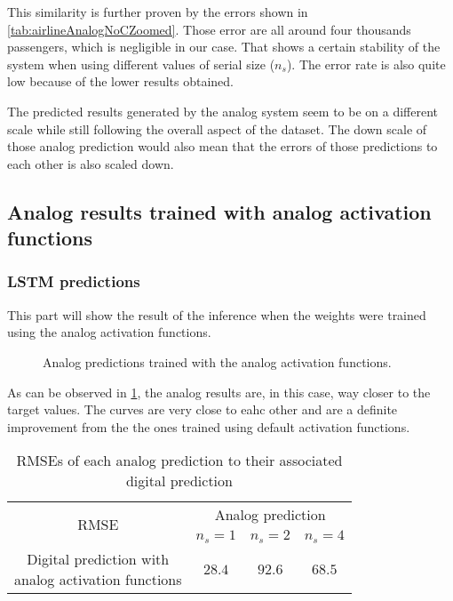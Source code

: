 This similarity is further proven by the errors shown in \cref{tab:airlineAnalogNoCZoomed}. Those error are all around four thousands passengers, which is negligible in our case. That shows a certain stability of the system when using different values of serial size ($n_s$). The error rate is also quite low because of the lower results obtained.

The predicted results generated by the analog system seem to be on a different scale while still following the overall aspect of the dataset. The down scale of those analog prediction would also mean that the errors of those predictions to each other is also scaled down.

\subsection{Analog results trained with analog activation functions}

\subsubsection{\ac{LSTM} predictions}

This part will show the result of the inference when the weights were trained using the analog activation functions.

\begin{figure}[H]
  \centering
  
  \caption{Analog predictions trained with the analog activation functions.}
  \label{graph:airlineAnalog}
\end{figure}

As can be observed in \cref{graph:airlineAnalog}, the analog results are, in this case, way closer to the target values. The curves are very close to eahc other and are a definite improvement from the the ones trained using default activation functions.

\begin{table}[H]
  \centering
  \begin{tabular}{|c|c|c|c|}
    \hline
    \multirow{2}{*}{\acs{RMSE}} & \multicolumn{3}{|c|}{Analog prediction}\\
    \cline{2-4}
    & $n_s=1$ & $n_s=2$ & $n_s=4$ \\
    \hline
    \specialcell{Digital prediction with\\analog activation functions} & $28.4$ & $92.6$ & $68.5$\\
    \hline
  \end{tabular}
  \caption{\acp{RMSE} of each analog prediction to their associated digital prediction}
  \label{tab:airlineAnalog}
\end{table}


